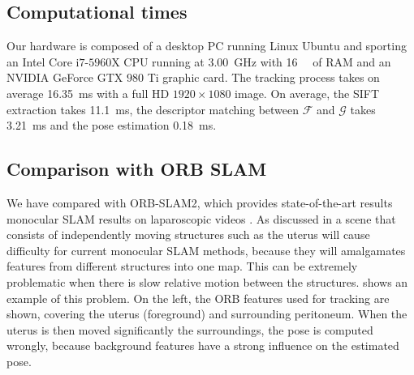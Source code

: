 \subsection{Computational times}
Our hardware is composed of a desktop PC running Linux Ubuntu and sporting an Intel Core i$7$-$5960$X CPU running at \SI{3.00}{\giga\hertz} with \SI{16}{\giga\byte} of RAM and an NVIDIA GeForce GTX $980$ Ti graphic card.
The tracking process takes on average \SI{16.35}{\milli\second} with a full HD $1920\times1080$ image.
On average, the SIFT extraction takes \SI{11.1}{\milli\second}, the descriptor matching between $\mathcal{F}$ and $\mathcal{G}$ takes \SI{3.21}{\milli\second}  and the pose estimation \SI{0.18}{\milli\second}.

\subsection{Comparison with ORB SLAM}
\label{sec:orbslam}
We have compared with ORB-SLAM2, which provides state-of-the-art results monocular SLAM results on laparoscopic videos \cite{orbslam_laparo}. As discussed in  a scene that consists of independently moving structures such as the uterus will cause difficulty for current monocular SLAM methods, because they will amalgamates features from different structures into one map. This can be extremely problematic when there is slow relative motion between the structures.  shows an example of this problem. On the left, the ORB features used for tracking are shown, covering the uterus (foreground) and surrounding peritoneum. When the uterus is then moved significantly \wrt the surroundings, the pose is computed wrongly, because background features have a strong influence on the estimated pose.


% 

